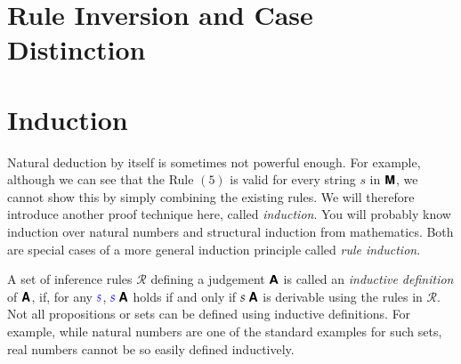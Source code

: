 \documentclass{book}
\begin{document}
\section{Rule Inversion and Case Distinction}
\section{Induction} 

Natural deduction by itself is sometimes not powerful enough. For example,
although we can see that the Rule $(5)$ is valid for every string $s$
in $\textsf{\textbf{M}}$, we cannot show this by simply combining the existing rules. We will
therefore introduce another proof technique here, called \emph{induction}. You
will probably know induction over natural numbers and structural induction
from mathematics. Both are special cases of a more
general induction principle called \emph{rule induction}. 

A set of inference rules $\mathcal{R}$ defining a judgement $\textsf{\textbf{A}}$ is 
called an \emph{inductive definition} of $\textsf{\textbf{A}}$, if, for any $\textcolor{blue}{s}$, ${\textcolor{blue}{s}}\;\textsf{\textbf{A}}$ 
holds if and only if ${s}\;\textsf{\textbf{A}}$ is derivable using the rules in $\mathcal{R}$.
Not all propositions or sets can be defined using inductive
definitions. For example, while natural numbers are one of the standard
examples for such sets, real numbers cannot be so easily defined inductively.
\end{document}
